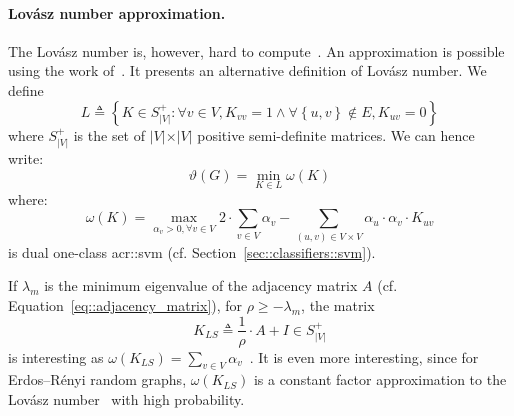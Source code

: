             \paragraph{Lov\'asz number approximation.}
                The Lov\'asz number is, however, hard to compute~\parencite{johansson2014global}.
                An approximation is possible using the work of~\textcite{jethava2013lovasz}.
                It presents an alternative definition of Lov\'asz number.
                We define $$L \triangleq \left\{K \in S_{\vert V \vert}^+: \forall v \in V, K_{vv} = 1 \wedge \forall \left\{u, v\right\}  \notin E, K_{uv} = 0\right\}$$ where $S_{\vert V \vert}^+$ is the set of $\vert V \vert \times \vert V \vert$ positive semi-definite matrices.
                We can hence write:
                \begin{equation}
                    \label{eq::lovazs_number_alternative}
                    \vartheta(G) = \min_{K \in L} \omega(K)
                \end{equation}
                where:
                \begin{equation}
                    \omega(K) = \max_{\alpha_v > 0, \forall v \in V} 2\cdot \sum_{v\in V} \alpha_v - \sum_{(u, v) \in V\times V} \alpha_u \cdot \alpha_v \cdot K_{uv}
                \end{equation}
                is dual one-class \gls{acr::svm} (cf. Section~\ref{sec::classifiers::svm}).

                If $\lambda_m$ is the minimum eigenvalue of the adjacency matrix $A$ (cf. Equation~\ref{eq::adjacency_matrix}), for $\rho\geq-\lambda_m$, the matrix
                \begin{equation}
                    \label{eq::ls_matrix}
                    K_{LS} \triangleq \frac{1}{\rho} \cdot A + I \in S_{\vert V \vert}^+
                \end{equation}
                is interesting as $\omega(K_{LS}) = \sum_{v\in V} \alpha_v$~\parencite{jethava2013lovasz}.
                It is even more interesting, since for Erdos–R\'enyi random graphs, $\omega(K_{LS})$ is a constant factor approximation to the Lov\'asz number~\parencite{jethava2013lovasz} with high probability.

